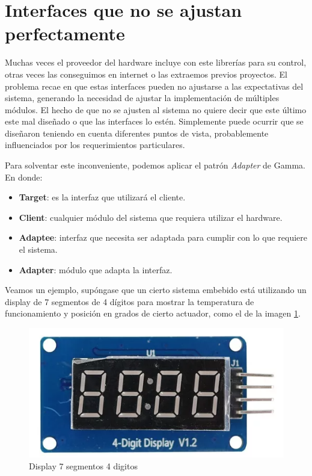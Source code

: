 \section{Interfaces que no se ajustan perfectamente}
Muchas veces el proveedor del hardware incluye con este librerías para su control, otras veces las conseguimos en internet o las extraemos previos proyectos. El problema recae en que estas interfaces pueden no ajustarse a las expectativas del sistema, generando la necesidad de ajustar la implementación de múltiples módulos. El hecho de que no se ajusten al sistema no quiere decir que este último este mal diseñado o que las interfaces lo estén. Simplemente puede ocurrir que se diseñaron teniendo en cuenta diferentes puntos de vista, probablemente influenciados por los requerimientos particulares.

Para solventar este inconveniente, podemos aplicar el patrón \textit{Adapter} de Gamma. En donde:

\begin{itemize}
    \item \textbf{Target}: es la interfaz que utilizará el cliente.
    \item \textbf{Client}: cualquier módulo del sistema que requiera utilizar el hardware.
    \item \textbf{Adaptee}: interfaz que necesita ser adaptada para cumplir con lo que requiere el sistema.
    \item \textbf{Adapter}: módulo que adapta la interfaz.
\end{itemize}

Veamos un ejemplo, supóngase que un cierto sistema embebido está utilizando un display de 7 segmentos de 4 dígitos para mostrar la temperatura de funcionamiento y posición en grados de cierto actuador, como el de la imagen \ref{fig:enter-label}.

\begin{figure}[h]
    \centering
    \includegraphics[width=0.5\linewidth]{display.png}
    \caption{Display 7 segmentos 4 digitos}
    \label{fig:enter-label}
\end{figure}

